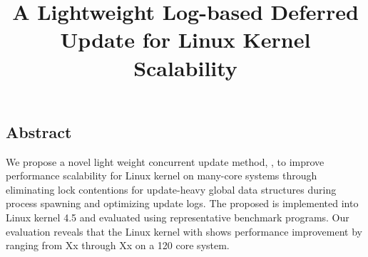 \documentclass[letterpaper,twocolumn,10pt]{article}
\begin{document}
\date{}

\title{\Large \bf A Lightweight Log-based Deferred Update for Linux Kernel
Scalability}


\maketitle

\newif\ifkor
\kortrue 

\thispagestyle{empty}

\subsection*{Abstract}
We propose a novel light weight concurrent update method, , 
to improve performance scalability for Linux kernel on many-core systems
through eliminating lock contentions for update-heavy global data structures
during process spawning and optimizing update logs. 
The proposed  is implemented into Linux kernel 4.5 and evaluated 
using representative benchmark programs. 
Our evaluation reveals that the Linux kernel with  shows performance
improvement by ranging from Xx through Xx on a 120 core system.

\ifkor
\begin{CJK}{UTF8}{}
\fi













\ifkor
\end{CJK}
\fi
\end{document}
